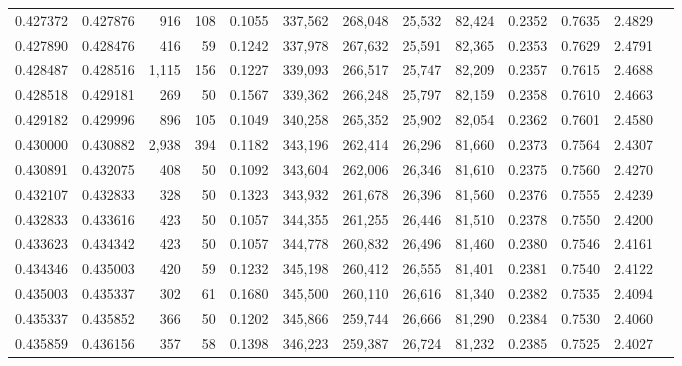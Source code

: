 \begin{tabular}{rrrrrrrrrrrrr}
0.427372 & 0.427876 &   916 & 108 &                                     0.1055 & 337,562 & 268,048 &  25,532 &  82,424 & 0.2352 & 0.7635 & 2.4829 \\
0.427890 & 0.428476 &   416 &  59 &                                     0.1242 & 337,978 & 267,632 &  25,591 &  82,365 & 0.2353 & 0.7629 & 2.4791 \\
0.428487 & 0.428516 & 1,115 & 156 &                                     0.1227 & 339,093 & 266,517 &  25,747 &  82,209 & 0.2357 & 0.7615 & 2.4688 \\
0.428518 & 0.429181 &   269 &  50 &                                     0.1567 & 339,362 & 266,248 &  25,797 &  82,159 & 0.2358 & 0.7610 & 2.4663 \\
0.429182 & 0.429996 &   896 & 105 &                                     0.1049 & 340,258 & 265,352 &  25,902 &  82,054 & 0.2362 & 0.7601 & 2.4580 \\
0.430000 & 0.430882 & 2,938 & 394 &                                     0.1182 & 343,196 & 262,414 &  26,296 &  81,660 & 0.2373 & 0.7564 & 2.4307 \\
0.430891 & 0.432075 &   408 &  50 &                                     0.1092 & 343,604 & 262,006 &  26,346 &  81,610 & 0.2375 & 0.7560 & 2.4270 \\
0.432107 & 0.432833 &   328 &  50 &                                     0.1323 & 343,932 & 261,678 &  26,396 &  81,560 & 0.2376 & 0.7555 & 2.4239 \\
0.432833 & 0.433616 &   423 &  50 &                                     0.1057 & 344,355 & 261,255 &  26,446 &  81,510 & 0.2378 & 0.7550 & 2.4200 \\
0.433623 & 0.434342 &   423 &  50 &                                     0.1057 & 344,778 & 260,832 &  26,496 &  81,460 & 0.2380 & 0.7546 & 2.4161 \\
0.434346 & 0.435003 &   420 &  59 &                                     0.1232 & 345,198 & 260,412 &  26,555 &  81,401 & 0.2381 & 0.7540 & 2.4122 \\
0.435003 & 0.435337 &   302 &  61 &                                     0.1680 & 345,500 & 260,110 &  26,616 &  81,340 & 0.2382 & 0.7535 & 2.4094 \\
0.435337 & 0.435852 &   366 &  50 &                                     0.1202 & 345,866 & 259,744 &  26,666 &  81,290 & 0.2384 & 0.7530 & 2.4060 \\
0.435859 & 0.436156 &   357 &  58 &                                     0.1398 & 346,223 & 259,387 &  26,724 &  81,232 & 0.2385 & 0.7525 & 2.4027 \\

\end{tabular}
